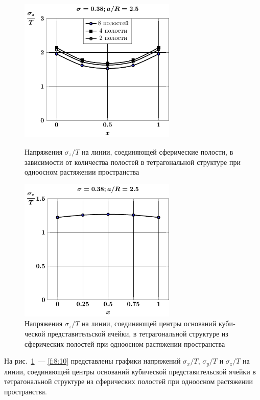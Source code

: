 \begin{russian}
\begin{figure}[h!]
\centering\footnotesize
\parbox[b]{7.5cm}{\centering\includegraphics[width=7.5cm]{cav8-4-2-sig_z-spheres.pdf}
\caption{Напряжения $\sigma_z/T$ на линии, соединяющей сферические полости, в зависимости от количества полостей в тетрагональной структуре при одноосном растяжении пространства
\label{f:8:8}}}\hfil\hfil
\parbox[b]{7.5cm}{\centering\includegraphics[width=7.5cm]{cav8-a25-c-c-sig_z-spheres.pdf}
\caption{Напряжения $\sigma_z/T$ на линии, соединяющей центры оснований кубической представительской ячейки, в тетрагональной структуре из сферических полостей при одноосном растяжении пространства
\label{f:8:11}}}
\end{figure}


На рис.~\ref{f:8:11}~--- \ref{f:8:10} представлены графики напряжений $\sigma_x/T$, $\sigma_y/T$ и $\sigma_z/T$ на линии, соединяющей центры оснований кубической представительской ячейки в тетрагональной структуре из сферических полостей при одноосном растяжении пространства.


\end{russian}
